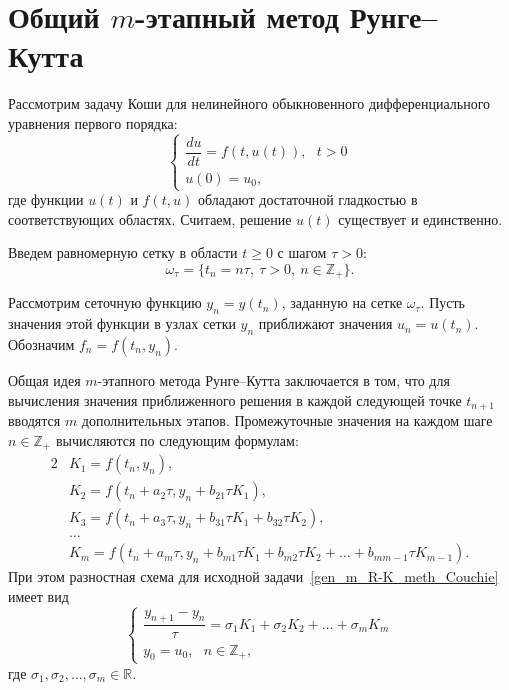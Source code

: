 \documentclass[11pt,a4paper,twoside]{report}
\numberwithin{equation}{section}
\theoremstyle{definition}
\theoremstyle{plain}
\begin{document}
\section{Общий $m$-этапный метод Рунге--Кутта}
%
%
Рассмотрим задачу Коши для нелинейного обыкновенного дифференциального
уравнения первого порядка:
%
\begin{equation}
    \label{gen_m_R-K_meth_Couchie}
    \begin{cases}
        \dfrac{du}{dt} = f(t,u(t)),~~~t>0 \\
        u(0) = u_0,
    \end{cases}
\end{equation}
%
где функции $u(t)$ и $f(t, u)$ обладают достаточной гладкостью в соответствующих
областях. Считаем, решение $u(t)$ существует и единственно.

Введем равномерную сетку в области $t\geqslant 0$ с шагом $\tau > 0$:
%
$$
    \omega_\tau=\{t_n=n\tau,~\tau > 0,~n\in\mathbb{Z}_+\}.
$$

Рассмотрим сеточную функцию $y_n = y(t_n)$, заданную
на сетке $\omega_\tau$. Пусть значения этой функции в узлах сетки $y_n$ приближают
значения $u_n=u(t_n)$. Обозначим $f_n=f(t_n,y_n)$.

Общая идея $m$-этапного метода Рунге--Кутта заключается в том, что
для вычисления значения приближенного решения в каждой следующей точке $t_{n+1}$
вводятся $m$ дополнительных этапов.
Промежуточные значения на каждом шаге $n\in\mathbb{Z}_+$ вычисляются по
следующим формулам:
%
\begin{alignat*}{2}
%
    &K_1 = f(t_n, y_n), \\
    &K_2 = f(t_n + a_2\tau, y_n + b_{21} \tau K_1), \\
    &K_3 = f(t_n + a_3\tau, y_n + b_{31}\tau K_1 + b_{32}\tau K_2), \\
    &\dots \\
    &K_m = f(t_n+a_m\tau, y_n + b_{m1} \tau K_1 + b_{m2} \tau K_2 + \ldots + b_{m m -1} \tau K_{m-1}).
%
\end{alignat*}
%
При этом разностная схема для исходной задачи~\eqref{gen_m_R-K_meth_Couchie}
имеет вид
%
\begin{equation}
    \label{gen_Runge-Kutt_meth}
    \begin{cases}
        \dfrac{y_{n+1} - y_n}{\tau} = \sigma_1 K_1 + \sigma_2 K_2 + \ldots + \sigma_m K_m \\
        y_0 = u_0,~~~n \in \mathbb{Z}_+,
    \end{cases}
\end{equation}
%
где $\sigma_1, \sigma_2, \ldots, \sigma_m \in\mathbb{R}$.
\end{document}
